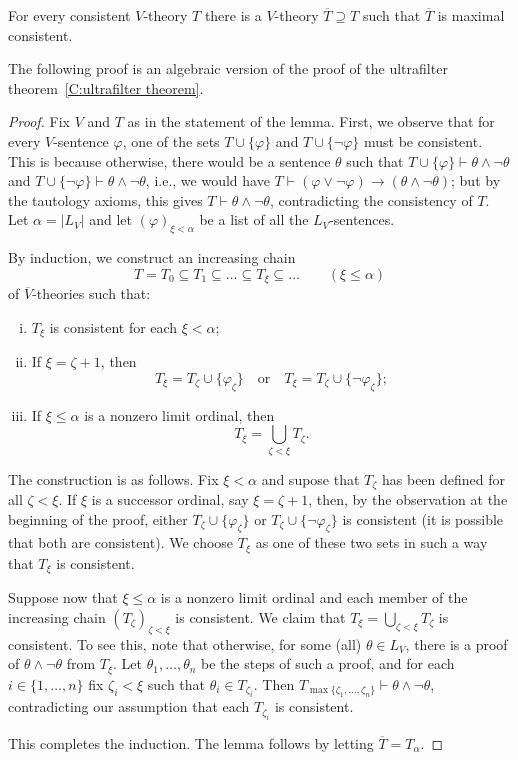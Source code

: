 \documentclass{scrartcl}
\renewcommand{\phi}{\varphi}
\begin{document}
\begin{lemma}
\label{L:Max consistent}
For every consistent $V$-theory $T$ there is a $V$-theory $\overline{T}\supseteq T$ such that $\overline{T}$ is maximal consistent.
\end{lemma}

The following proof is an algebraic version of the proof of the ultrafilter theorem~\ref{C:ultrafilter theorem}.

\begin{proof}
Fix $V$ and $T$ as in the statement of the lemma. First, we observe that for every $V$-sentence $\phi$, one of the sets $T\cup\{\phi\}$ and $T\cup\{\neg\phi\}$ must be consistent. This is because otherwise, there would be a sentence $\theta$ such that $T\cup\{\phi\}\vdash\theta\land \neg \theta$ and $T\cup\{\neg\phi\}\vdash\theta\land \neg \theta$, i.e., we would have 
$T\vdash (\phi\lor\neg\phi)\to(\theta\land\neg\theta)$; but by the tautology axioms, this gives $T\vdash \theta\land\neg\theta$, contradicting the consistency of $T$.
Let $\alpha = |L_V|$ and let $(\phi)_{\xi<\alpha}$ be a list of all the $L_V$-sentences.

By induction, we construct an increasing chain 
\[
T=T_0\subseteq T_1\subseteq \dots\subseteq T_\xi\subseteq\dots\qquad (\xi\le\alpha)
\]
of $\overline{V}$-theories  such that:

\begin{enumerate}[i)]
\item $T_\xi$ is consistent for each $\xi<\alpha$;
\item If $\xi = \zeta +1$, then 
\[
T_\xi = T_\zeta \cup \{\phi_\zeta\}
\quad\text{or}\quad
T_\xi = T_\zeta \cup \{\neg\phi_\zeta\};
\]
\item If $\xi\le\alpha$ is a nonzero limit ordinal, then
\[
T_\xi = \bigcup_{\zeta <\xi}T_\zeta\text{.}
\]
\end{enumerate}

The construction is as follows. Fix $\xi<\alpha$ and supose that $T_\zeta$ has been defined for all $\zeta<\xi$. If $\xi$ is a successor ordinal, say $\xi=\zeta+1$, then, by the observation at the beginning of the proof,
either $T_\zeta \cup \{\phi_\zeta\}$ or $T_\zeta \cup \{\neg\phi_\zeta\}$ is consistent (it is possible that both are consistent).
 We choose $T_\xi$ as one of these two sets in such a way that $T_\xi$ is consistent.

Suppose now that $\xi\le\alpha$ is a nonzero limit ordinal and each member of the increasing chain $(T_\zeta)_{\zeta<\xi}$ is consistent. We claim that $T_\xi = \bigcup_{\zeta<\xi}T_\zeta$ is consistent. To see this, note that otherwise, for some (all)  $\theta\in L_V$, there is a proof of $\theta\wedge\neg\theta$ from $T_\xi$. Let  $\theta_1,\dots,\theta_n$ be the steps of such a proof, and for each $i\in\{1,\dots, n\}$ fix $\zeta_i<\xi$ such that $\theta_{i}\in T_{\zeta_i}$. Then $T_{\max\{\zeta_1,\dots,\zeta_n\}}\vdash \theta\land\neg\theta$, contradicting our assumption that each $T_{\zeta_i}$ is consistent.

This completes the induction. The lemma follows by letting $\overline{T} = T_\alpha$.
\end{proof}
\end{document}
